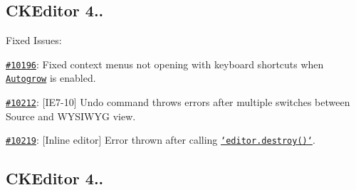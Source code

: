 \subsection*{C\-K\-Editor 4..}

Fixed Issues\-:
\begin{DoxyItemize}
\item \href{http://dev.ckeditor.com/ticket/10196}{\tt \#10196}\-: Fixed context menus not opening with keyboard shortcuts when \href{http://ckeditor.com/addon/autogrow}{\tt Autogrow} is enabled.
\item \href{http://dev.ckeditor.com/ticket/10212}{\tt \#10212}\-: \mbox{[}I\-E7-\/10\mbox{]} Undo command throws errors after multiple switches between Source and W\-Y\-S\-I\-W\-Y\-G view.
\item \href{http://dev.ckeditor.com/ticket/10219}{\tt \#10219}\-: \mbox{[}Inline editor\mbox{]} Error thrown after calling \href{http://docs.ckeditor.com/#!/api/CKEDITOR.editor-method-destroy}{\tt `editor.destroy()`}.
\end{DoxyItemize}

\subsection*{C\-K\-Editor 4..}

